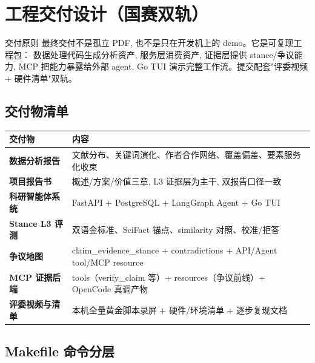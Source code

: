 \section{工程交付设计（国赛双轨）}

\begin{designbox}{交付原则}
最终交付不是孤立 PDF, 也不是只在开发机上的 demo。它是可复现工程包：
数据处理代码生成分析资产, 服务层消费资产, 证据层提供 stance/争议能力,
MCP 把能力暴露给外部 agent, Go TUI 演示完整工作流。提交配套"评委视频 + 硬件清单"双轨。
\end{designbox}

\subsection{交付物清单}

\begin{center}
\begin{tabularx}{\textwidth}{>{\bfseries}p{31mm}X}
\toprule
交付物 & 内容 \\
\midrule
数据分析报告 & 文献分布、关键词演化、作者合作网络、覆盖偏差、要素服务化收束 \\
项目报告书 & 概述/方案/价值三章, L3 证据层为主干, 双报告口径一致 \\
科研智能体系统 & FastAPI + PostgreSQL + LangGraph Agent + Go TUI \\
Stance L3 评测 & 双语金标准、SciFact 锚点、similarity 对照、校准/拒答 \\
争议地图 & claim\_evidence\_stance + contradictions + API/Agent tool/MCP resource \\
MCP 证据后端 & tools（verify\_claim 等）+ resources（争议前线）+ OpenCode 真调产物 \\
评委视频与清单 & 本机全量黄金脚本录屏 + 硬件/环境清单 + 逐步复现文档 \\
\bottomrule
\end{tabularx}
\end{center}

\subsection{Makefile 命令分层}

